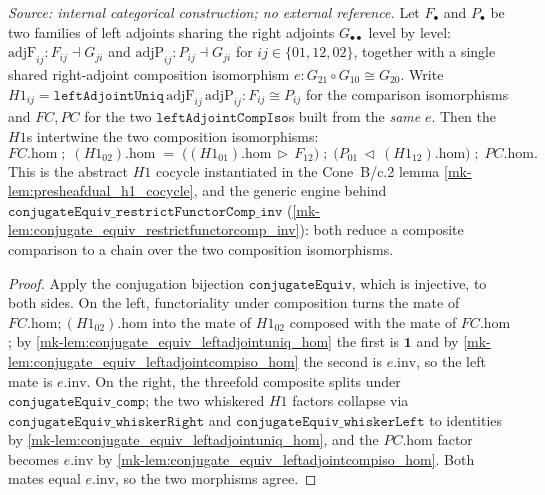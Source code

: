 \begin{lemma}\label{mk-lem:leftadjointuniq_leftadjointcompiso_comm}
  \leanok

  \textit{Source: internal categorical construction; no external reference.}
  Let \(F_\bullet\) and \(P_\bullet\) be two families of left adjoints sharing the right adjoints
  \(G_{\bullet\bullet}\) level by level: \(\mathrm{adjF}_{ij} : F_{ij} \dashv G_{ji}\) and
  \(\mathrm{adjP}_{ij} : P_{ij} \dashv G_{ji}\) for \(ij \in \{01, 12, 02\}\), together with a single
  shared right-adjoint composition isomorphism \(e : G_{21} \circ G_{10} \cong G_{20}\). Write
  \(H1_{ij} = \mathtt{leftAdjointUniq}\,\mathrm{adjF}_{ij}\,\mathrm{adjP}_{ij} : F_{ij} \cong P_{ij}\)
  for the comparison isomorphisms and \(FC, PC\) for the two
  \(\mathtt{leftAdjointCompIso}\)s built from the \emph{same} \(e\). Then the \(H1\)s intertwine the two
  composition isomorphisms:
  \[
    FC.\mathrm{hom} \;\mathbin{;}\; (H1_{02}).\mathrm{hom}
      \;=\; \bigl((H1_{01}).\mathrm{hom} \,\triangleright\, F_{12}\bigr)
        \;\mathbin{;}\; \bigl(P_{01} \,\triangleleft\, (H1_{12}).\mathrm{hom}\bigr)
        \;\mathbin{;}\; PC.\mathrm{hom} .
  \]
  This is the abstract \(H1\) cocycle instantiated in the Cone~B/c.2 lemma
  \ref{mk-lem:presheafdual_h1_cocycle}, and the generic engine behind
  \(\mathtt{conjugateEquiv\_restrictFunctorComp\_inv}\)
  (\ref{mk-lem:conjugate_equiv_restrictfunctorcomp_inv}): both reduce a composite comparison to a chain
  over the two composition isomorphisms.
\end{lemma}
\begin{proof}
  \leanok
  Apply the conjugation bijection \(\mathtt{conjugateEquiv}\), which is injective, to both sides. On the
  left, functoriality under composition turns the mate of \(FC.\mathrm{hom} \mathbin{;} (H1_{02}).\mathrm{hom}\)
  into the mate of \(H1_{02}\) composed with the mate of \(FC.\mathrm{hom}\); by
  \ref{mk-lem:conjugate_equiv_leftadjointuniq_hom} the first is \(\mathbf{1}\) and by
  \ref{mk-lem:conjugate_equiv_leftadjointcompiso_hom} the second is \(e.\mathrm{inv}\), so the left mate is
  \(e.\mathrm{inv}\). On the right, the threefold composite splits under
  \(\mathtt{conjugateEquiv\_comp}\); the two whiskered \(H1\) factors collapse via
  \(\mathtt{conjugateEquiv\_whiskerRight}\) and \(\mathtt{conjugateEquiv\_whiskerLeft}\) to identities by
  \ref{mk-lem:conjugate_equiv_leftadjointuniq_hom}, and the \(PC.\mathrm{hom}\) factor becomes
  \(e.\mathrm{inv}\) by \ref{mk-lem:conjugate_equiv_leftadjointcompiso_hom}. Both mates equal \(e.\mathrm{inv}\),
  so the two morphisms agree.
\end{proof}

